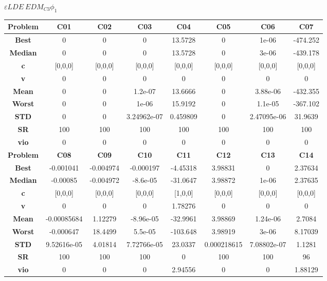 \documentclass{IEEEtran}
\begin{document}
\begin{center}
$\varepsilon LDE\ EDM_{C3} \phi_1$
  \begin{tabular}{|c|c|c|c|c|c|c|c|}
    \hline 
    \textbf{Problem} & \textbf{C01} & \textbf{C02} & \textbf{C03} & \textbf{C04} & \textbf{C05} & \textbf{C06} & \textbf{C07} \\ 
    \hline\hline 
    \textbf{Best} & 0 & 0 & 0 & 13.5728 & 0 & 1e-06 & -474.252\\ 
    \textbf{Median} & 0 & 0 & 0 & 13.5728 & 0 & 3e-06 & -439.178\\ 
    \textbf{c} & [0,0,0] & [0,0,0] & [0,0,0] & [0,0,0] & [0,0,0] & [0,0,0] & [0,0,0]\\ 
    \textbf{v} & 0 & 0 & 0 & 0 & 0 & 0 & 0\\ 
    \textbf{Mean} & 0 & 0 & 1.2e-07 & 13.6666 & 0 & 3.88e-06 & -432.355\\ 
    \textbf{Worst} & 0 & 0 & 1e-06 & 15.9192 & 0 & 1.1e-05 & -367.102\\ 
    \textbf{STD} & 0 & 0 & 3.24962e-07 & 0.459809 & 0 & 2.47095e-06 & 31.9639\\ 
    \textbf{SR} & 100 & 100 & 100 & 100 & 100 & 100 & 100\\ 
    \textbf{vio} & 0 & 0 & 0 & 0 & 0 & 0 & 0\\ 
    \hline 
    \hline 
    \textbf{Problem} & \textbf{C08} & \textbf{C09} & \textbf{C10} & \textbf{C11} & \textbf{C12} & \textbf{C13} & \textbf{C14} \\ 
    \hline\hline 
    \textbf{Best} & -0.001041 & -0.004974 & -0.000197 & -4.45318 & 3.98831 & 0 & 2.37634\\ 
    \textbf{Median} & -0.00085 & -0.004972 & -8.6e-05 & -31.0647 & 3.98872 & 1e-06 & 2.37635\\ 
    \textbf{c} & [0,0,0] & [0,0,0] & [0,0,0] & [1,0,0] & [0,0,0] & [0,0,0] & [0,0,0]\\ 
    \textbf{v} & 0 & 0 & 0 & 1.78276 & 0 & 0 & 0\\ 
    \textbf{Mean} & -0.00085684 & 1.12279 & -8.96e-05 & -32.9961 & 3.98869 & 1.24e-06 & 2.7084\\ 
    \textbf{Worst} & -0.000647 & 18.4499 & 5.5e-05 & -103.648 & 3.98919 & 3e-06 & 8.17039\\ 
    \textbf{STD} & 9.52616e-05 & 4.01814 & 7.72766e-05 & 23.0337 & 0.000218615 & 7.08802e-07 & 1.1281\\ 
    \textbf{SR} & 100 & 100 & 100 & 0 & 100 & 100 & 96\\ 
    \textbf{vio} & 0 & 0 & 0 & 2.94556 & 0 & 0 & 1.88129\\ 

\end{tabular}
\end{center}
\end{document}
